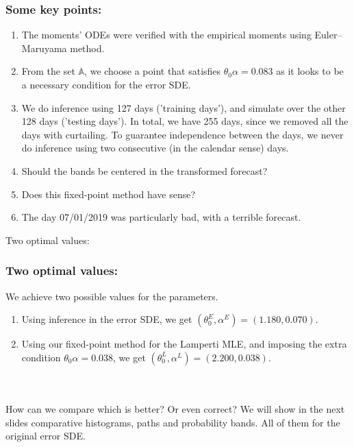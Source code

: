 \documentclass[aspectratio=169]{beamer}\usepackage[utf8]{inputenc}
\begin{document}
\begin{frame}\frametitle{Some key points:}

\begin{enumerate}

\item The moments' ODEs were verified with the empirical moments using Euler–Maruyama method.
\item From the set $\mathbb{A}$, we choose a point that satisfies $\theta_0\alpha=0.083$ as it looks to be a necessary condition for the error SDE.
\item We do inference using 127 days ('training days'), and simulate over the other 128 days ('testing days'). In total, we have  255 days, since we removed all the days with curtailing. To guarantee independence between the days, we never do inference using two consecutive (in the calendar sense) days.
\item \alert{Should the bands be centered in the transformed forecast?}
\item \alert{Does this fixed-point method have sense?}
\item The day 07/01/2019 was particularly bad, with a terrible forecast.

\end{enumerate}

\end{frame}


\begin{frame}

{\Huge Two optimal values:}

\end{frame}


\begin{frame}\frametitle{Two optimal values:}

We achieve two possible values for the parameters.
\begin{enumerate}

\item Using inference in the error SDE, we get $(\theta_0^E,\alpha^E)=(1.180,0.070)$.
\item Using our fixed-point method for the Lamperti MLE, and imposing the extra condition $\theta_0\alpha=0.038$, we get $(\theta_0^L,\alpha^L)=(2.200,0.038)$.

\end{enumerate}
\quad\\
\quad\\
\alert{How can we compare which is better? Or even correct?} We will show in the next slides comparative histograms, paths and probability bands. All of them for the original error SDE.

\end{frame}
\end{document}
